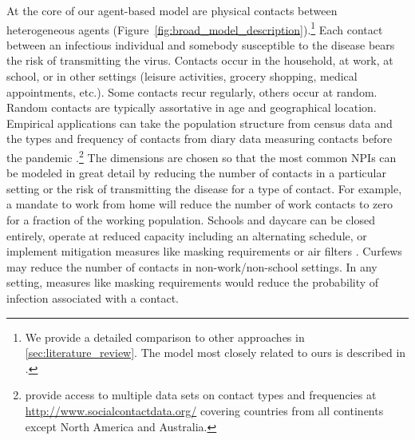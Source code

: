 At the core of our agent-based model are physical contacts between heterogeneous agents
(Figure~\ref{fig:broad_model_description}).\footnote{We provide a detailed comparison to
other approaches in \ref{sec:literature_review}. The model most closely related to ours
is described in \citet{Hinch2020}.} Each contact between an infectious individual and
somebody susceptible to the disease bears the risk of transmitting the virus. Contacts
occur in the household, at work, at school, or in other settings (leisure activities,
grocery shopping, medical appointments, etc.). Some contacts recur regularly, others occur at random. Random contacts are
typically assortative in age and geographical location. Empirical applications can take
the population structure from census data and the types and frequency of contacts from
diary data measuring contacts before the pandemic
\citep[e.g.][]{Mossong2008}.\footnote{\citet{Hoang2019} provide access to multiple data
sets on contact types and frequencies at \url{http://www.socialcontactdata.org/} covering
countries from all continents except North America and Australia.} The dimensions are
chosen so that the most common NPIs can be modeled in great detail by reducing the number
of contacts in a particular setting or the risk of transmitting the disease for a type of
contact. For example, a mandate to work from home will reduce the number of work contacts
to zero for a fraction of the working population. Schools and daycare can be closed
entirely, operate at reduced capacity including an alternating schedule, or implement
mitigation measures like masking requirements or air filters \citep{Lessler2021}. Curfews
may reduce the number of contacts in non-work/non-school settings. In any setting,
measures like masking requirements would reduce the probability of infection associated
with a contact.

